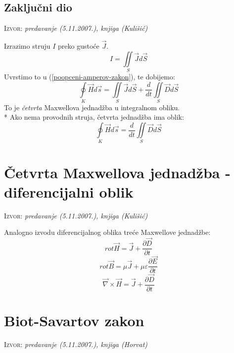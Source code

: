 \documentclass{report}
\begin{document}
\subsection{Zaključni dio}
\small \textsc{Izvor:} \textit{predavanje (5.11.2007.), knjiga (Kulišić)}

Izrazimo struju $I$ preko gustoće $\vec J$.
$$I = \iint\limits_S {\vec J d \vec S}$$
Uvrstimo to u (\ref{poopceni-amperov-zakon}), te dobijemo:
\begin{equation}
	\oint\limits_K {\vec H d \vec s} = \iint\limits_S {\vec J d \vec S} + \frac{d}{dt} \iint\limits_S {\vec D d \vec S}
	\label{cetvrta-maxwellova-jednadzba-int}
\end{equation}
To je \textit{četvrta} Maxwellova jednadžba u integralnom obliku.\\*
Ako nema provodnih struja, četvrta jednadžba ima oblik:
$$\oint\limits_K {\vec H d \vec s} = \frac{d}{dt} \iint\limits_S {\vec D d \vec S}$$

\section{Četvrta Maxwellova jednadžba - diferencijalni oblik}
\small \textsc{Izvor:} \textit{predavanje (5.11.2007.), knjiga (Kulišić)}

Analogno izvodu diferencijalnog oblika treće Maxwellove jednadžbe:
\begin{equation}
	rot \vec H = \vec J + \frac{\partial \vec D}{\partial t}
	\label{cetvrta-maxwellova-u-diff-obliku-1}
\end{equation}
\begin{equation}
	rot \vec B = \mu \vec J + \mu \varepsilon \frac{\partial \vec E}{\partial t}
	\label{cetvrta-maxwellova-u-diff-obliku-2}
\end{equation}
\begin{equation}
	\vec \nabla \times \vec H = \vec J + \frac{\partial \vec D}{\partial t}
	\label{cetvrta-maxwellova-u-diff-obliku-3}
\end{equation}

\section{Biot-Savartov zakon}
\small \textsc{Izvor:} \textit{predavanje (5.11.2007.), knjiga (Horvat)}
\end{document}
